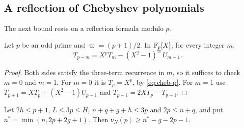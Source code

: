\subsection{A reflection of Chebyshev polynomials}
The next bound rests on a reflection formula modulo $p$.

\begin{lemma}\label{lem:u3-reflect}
Let $p$ be an odd prime and $\varpi=(p+1)/2$. In $\mathbb F_p[X]$, for every integer $m$,
\[
 T_{p-m}=X^pT_m-(X^2-1)^{\varpi}\,U_{m-1}.
\]
\end{lemma}

\begin{proof}
Both sides satisfy the three-term recurrence in $m$, so it suffices to check $m=0$ and $m=1$. For $m=0$ it
is $T_p=X^p$, by \eqref{eq:cheb-p}. For $m=1$ use $T_{p+1}=XT_p+(X^2-1)U_{p-1}$ and $T_{p-1}=2XT_p-T_{p+1}$.
\end{proof}

\begin{theorem}\label{thm:U}
Let $2h\le p+1$, $L\le3p\le H$, $n+q+g+h\le3p$ and $2p\le n+q$, and put $n^*=\min(n,2p+2g+1)$. Then
$\nu_N(p)\ge n^*-g-2p-1$.
\end{theorem}

